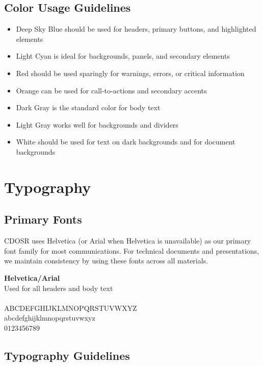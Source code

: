 \documentclass[11pt]{article}
\newcommand{\fontsample}[2]{%
\begin{tcolorbox}[
  colback=white,
  colframe=CDOSRPrimary,
  width=0.95\linewidth,
  arc=2mm,
  boxrule=0.5pt
]
  \textbf{#1}\\
  #2\\
  \\
  {\sffamily
  ABCDEFGHIJKLMNOPQRSTUVWXYZ\\
  abcdefghijklmnopqrstuvwxyz\\
  0123456789
  }
\end{tcolorbox}
}
\begin{document}
\subsection{Color Usage Guidelines}

\begin{itemize}[leftmargin=1cm, itemindent=0.25cm, noitemsep, topsep=0pt, label=$\bullet$]
    \item Deep Sky Blue should be used for headers, primary buttons, and highlighted elements
    \item Light Cyan is ideal for backgrounds, panels, and secondary elements
    \item Red should be used sparingly for warnings, errors, or critical information
    \item Orange can be used for call-to-actions and secondary accents
    \item Dark Gray is the standard color for body text
    \item Light Gray works well for backgrounds and dividers
    \item White should be used for text on dark backgrounds and for document backgrounds
\end{itemize}

\section{Typography}

\subsection{Primary Fonts}

CDOSR uses Helvetica (or Arial when Helvetica is unavailable) as our primary font family for most communications. For technical documents and presentations, we maintain consistency by using these fonts across all materials.

\fontsample{Helvetica/Arial}{Used for all headers and body text}

\subsection{Typography Guidelines}
\end{document}
